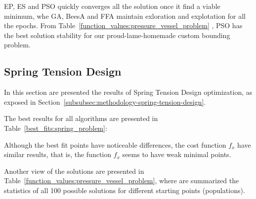 \documentclass[conference]{IEEEtran}
\begin{document}
EP, ES and PSO quickly converges all the solution once it find a viable minimum, whe GA, BeesA and FFA
maintain exloration and explotation for all the epochs. From Table~\ref{function_values:pressure_vessel_problem}
, PSO has the best solution stability for our proud-lame-homemade custom bounding problem.
\subsection{Spring Tension Design}
\label{ssubec:spring_problem}

In this section are presented the results of Spring Tension Design optimization,
as exposed in Section~\ref{subsubsec:methodology-spring-tension-design}.

The best results for all algorithms are presented in Table~\ref{best_fits:spring_problem}:

\begin{table}[H]
\centering
\caption{Best Fits for Spring Tension Design}
\label{best_fits:spring_problem}
\end{table}

Although the best fit points have noticeable differences, the cost function $f_x$ have similar results, that is, the
function $f_x$ seems to have weak minimal points.




Another view of the solutions are presented in Table~\ref{function_values:pressure_vessel_problem}, where
are summarized the statistics of all 100 possible solutions for different starting points (populations).
\end{document}
